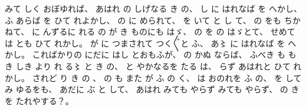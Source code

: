 みて
しく
おぼゆれば、
%
あはれ
の
しげなる
き
の、
%
し
に
はれなば
%
を
へかし、
%
ふ
あらば
を
ひて
れよかし、
%
の
に
められて、
%
を
いて
と
し
て、
%
の
をも
ちかねて、
%
に
んずるに
れる
の
が
き
ものにも
はゞ、%
%
%
の
を
の
はゞとて、%
%
せめては
とも
ひて
れかし。
%
が
に
つまされて
つく〴〵と
ふ、
%
あ〻%
に
はれなば
を
へかし。
%
こればかりの
にだに
はし
とおもふが、
%
の
かぬ
ならば、
%
ふべき
も
も
き
しき
より
れ
%
る〻%
と
き
の、
%
と
やかなるを
たる
は、
%
らず
あはれと
ひて
れかし。
%
されど
り
き
の
、
%
の
も
また
%
が
ふ
の
く、
%
は
おのれを
ふ
の、
%
を
して
み
ゆるをも、
%
あだに
ぶ
と
して、
%
あはれ
みても
やらず
%
みても
やらず、
%
の
きを
たれやする？。
